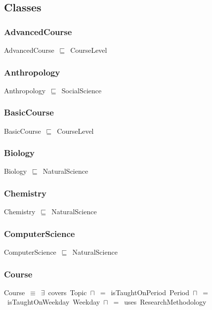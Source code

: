 \documentclass{article}
\begin{document}
\subsection*{Classes}

\subsubsection*{AdvancedCourse}

AdvancedCourse~\ensuremath{\sqsubseteq}~CourseLevel~

\subsubsection*{Anthropology}

Anthropology~\ensuremath{\sqsubseteq}~SocialScience~

\subsubsection*{BasicCourse}

BasicCourse~\ensuremath{\sqsubseteq}~CourseLevel~

\subsubsection*{Biology}

Biology~\ensuremath{\sqsubseteq}~NaturalScience~

\subsubsection*{Chemistry}

Chemistry~\ensuremath{\sqsubseteq}~NaturalScience~

\subsubsection*{ComputerScience}

ComputerScience~\ensuremath{\sqsubseteq}~NaturalScience~

\subsubsection*{Course}

Course~\ensuremath{\equiv}~\ensuremath{\exists}~covers~Topic~\ensuremath{\sqcap}~\ensuremath{=}~isTaughtOnPeriod~Period~\ensuremath{\sqcap}~\ensuremath{=}~isTaughtOnWeekday~Weekday~\ensuremath{\sqcap}~\ensuremath{=}~uses~ResearchMethodology
\end{document}

